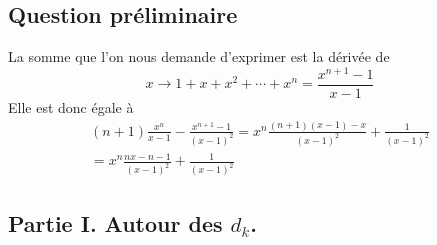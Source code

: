 \subsection*{Question préliminaire}
La somme que l'on nous demande d'exprimer est la dérivée de 
\begin{displaymath}
 x\rightarrow 1+x+x^2 + \cdots + x^n = \frac{x^{n+1}-1}{x-1}
\end{displaymath}
Elle est donc égale à
\begin{multline*}
 (n+1)\frac{x^n}{x-1}-\frac{x^{n+1}-1}{(x-1)^2}
=
x^n\frac{(n+1)(x-1)-x}{(x-1)^2} + \frac{1}{(x-1)^2}\\
= x^n\frac{nx-n-1}{(x-1)^2} + \frac{1}{(x-1)^2}
\end{multline*}

\subsection*{Partie I. Autour des $d_k$.}
